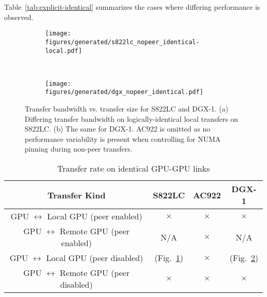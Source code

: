 Table~\ref{tab:explicit-identical} summarizes the cases where differing performance is observed.

\begin{figure}[ht]
	\centering
	\begin{subfigure}[b]{0.4\textwidth}
		\texttt{[image: figures/generated/s822lc\_nopeer\_identical-local.pdf]}
		\caption{}
		\label{fig:explicit-nopeer-identical-s822lc-local}
	\end{subfigure}
	~
	\begin{subfigure}[b]{0.4\textwidth}
		\texttt{[image: figures/generated/dgx\_nopeer\_identical.pdf]}
		\caption{}
		\label{fig:explicit-nopeer-identical-dgx-local}
	\end{subfigure}
	\caption[GPU-GPU \texttt{cudaMemcpy} Bandwidth on Identical Links]{
		Transfer bandwidth vs. transfer size for S822LC and DGX-1.
		(a) Differing transfer bandwidth on logically-identical local transfers on S822LC.
		(b) The same for DGX-1.
		AC922 is omitted as no performance variability is present when controlling for NUMA pinning during non-peer transfers.
	}
	\label{fig:explicit-nopeer-identical}
\end{figure}

\begin{table}[ht]
	\centering
	\caption[Transfer rate on identical GPU-GPU links]{Transfer rate on identical GPU-GPU links}
	\label{tab:explicit}
	\begin{tabular}{cccc}
		\hline
		\textbf{Transfer Kind}                                           & S822LC                                                              & AC922     & DGX-1                                                           \\ \hline 
		\makecell{ GPU $\leftrightarrow$ Local GPU  \\ (peer enabled)  } & $\times$                                                            & $\times$  & $\times$                                                        \\ \hline
		\makecell{ GPU $\leftrightarrow$ Remote GPU \\ (peer enabled)  } & N/A                                                                 & $\times$  & N/A                                                             \\ \hline
		\makecell{ GPU $\leftrightarrow$ Local GPU  \\ (peer disabled) } & \checkmark (Fig.~\ref{fig:explicit-nopeer-identical-s822lc-local})  & $\times$  & \checkmark (Fig.~\ref{fig:explicit-nopeer-identical-dgx-local}) \\ \hline
		\makecell{ GPU $\leftrightarrow$ Remote GPU \\ (peer disabled) } & $\times$                                                            & $\times$  & $\times$                                                        \\ \hline
	\end{tabular}
\end{table}

